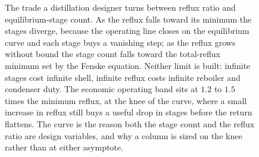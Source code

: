 \begin{figure}[htbp]
\centering
{}
\caption[The reflux-against-stages trade in distillation]{The trade a
distillation designer turns between reflux ratio and equilibrium-stage count.
As the reflux falls toward its minimum the stages diverge, because the
operating line closes on the equilibrium curve and each stage buys a
vanishing step; as the reflux grows without bound the stage count falls
toward the total-reflux minimum set by the Fenske equation. Neither limit is
built: infinite stages cost infinite shell, infinite reflux costs infinite
reboiler and condenser duty. The economic operating band sits at $1.2$ to
$1.5$ times the minimum reflux, at the knee of the curve, where a small
increase in reflux still buys a useful drop in stages before the return
flattens. The curve is the reason both the stage count and the reflux ratio
are design variables, and why a column is sized on the knee rather than at
either asymptote.}
\label{fig:vol04ch07:reflux-stages}
\end{figure}
